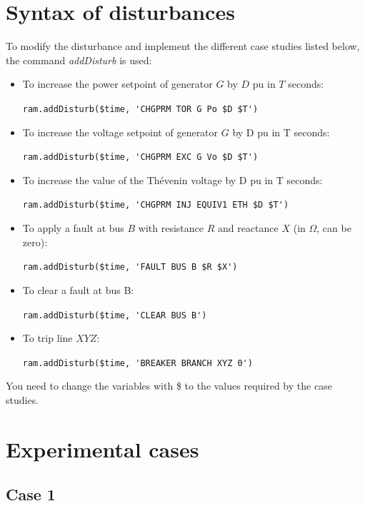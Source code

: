 \documentclass[a4paper,11pt,oneside,onecolumn]{article}
\newcommand\textcode{\Verb}
\begin{document}
\section{Syntax of disturbances}

To modify the disturbance and implement the different case studies listed below, the command \textit{addDisturb} is used:

\begin{itemize}
\item To increase the power setpoint of generator $G$ by $D$ pu in $T$ seconds: 

\textcode|ram.addDisturb($time, 'CHGPRM TOR G Po $D $T')|

\item To increase the voltage setpoint of generator $G$ by D pu in T seconds: 

\textcode|ram.addDisturb($time, 'CHGPRM EXC G Vo $D $T')|

\item To increase the value of the Thévenin voltage by D pu in T seconds: 

\textcode|ram.addDisturb($time, 'CHGPRM INJ EQUIV1 ETH $D $T')|

\item To apply a fault at bus $B$ with resistance $R$ and reactance $X$ (in $\Omega$, can be zero): 

\textcode|ram.addDisturb($time, 'FAULT BUS B $R $X')|

\item To clear a fault at bus B: 

\textcode|ram.addDisturb($time, 'CLEAR BUS B')|

\item To trip line $XYZ$:

\textcode|ram.addDisturb($time, 'BREAKER BRANCH XYZ 0')|

\end{itemize}

\noindent You need to change the variables with \$ to the values required by the case studies.

\section{Experimental cases}

\subsection{Case 1}
\end{document}
